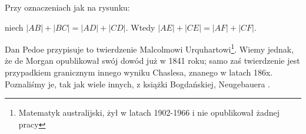 %

\begin{theorem}[Urquharta?]
%
    Przy oznaczeniach jak na rysunku:
    \begin{center}
\begin{comment}
    
    \begin{tikzpicture}[scale=.4]
        \tkzDefPoint(0, 0){E}
        \tkzDefPoint(267:5){E1}
        \tkzDefPoint(250:5){E2}
        \tkzDefPoint(165:5){E3}
        \tkzDefPoint(135:5){E4}
        
        \tkzDefLine[tangent at=E1](E) \tkzGetPoint{tan1}
        \tkzDefLine[tangent at=E2](E) \tkzGetPoint{tan2}
        \tkzDefLine[tangent at=E3](E) \tkzGetPoint{tan3}
        \tkzDefLine[tangent at=E4](E) \tkzGetPoint{tan4}
        
        \tkzInterLL(E4,tan4)(E1,tan1) \tkzGetPoint{S1}
        \tkzInterLL(E4,tan4)(E2,tan2) \tkzGetPoint{S2}
        \tkzInterLL(E3,tan3)(E1,tan1) \tkzGetPoint{S3}
        \tkzInterLL(E3,tan3)(E2,tan2) \tkzGetPoint{S4}

        \tkzInterLL(S3,S4)(S1,S2) \tkzGetPoint{Gorny}
        \tkzInterLL(S1,S3)(S2,S4) \tkzGetPoint{Dolny}

        \tkzLabelPoint[below](S1){$A$}
        \tkzLabelPoint[above left](S2){$D$}
        \tkzLabelPoint(S3){$B$}
        \tkzLabelPoint[above right](S4){$C$}
        \tkzLabelPoint(Dolny){$E$}
        \tkzLabelPoint[right](Gorny){$F$}

        \tkzDrawSegments[line width=0.2mm](S1,Dolny S1,Gorny S3,Gorny S2,Dolny)
        \tkzDrawPoints[size=3,color=black,fill=black!50](S1,S2,S3,S4,Dolny,Gorny)
\end{tikzpicture}
\end{comment}
    \end{center}
    niech $|AB| + |BC| = |AD| + |CD|$.
    Wtedy $|AE| + |CE| = |AF| + |CF|$.
\end{theorem}

Dan Pedoe
przypisuje to twierdzenie Malcolmowi Urquhartowi\footnote{Matematyk australijski, żył w latach 1902-1966 i nie opublikował żadnej pracy}.
%
Wiemy jednak, że de Morgan opublikował swój dowód już w 1841 roku; samo zaś twierdzenie jest przypadkiem granicznym innego wyniku Chaslesa, znanego w latach 186x.
Poznaliśmy je, tak jak wiele innych, z książki Bogdańskiej, Neugebauera \cite[s. 97]{neugebauer_2018}.

%